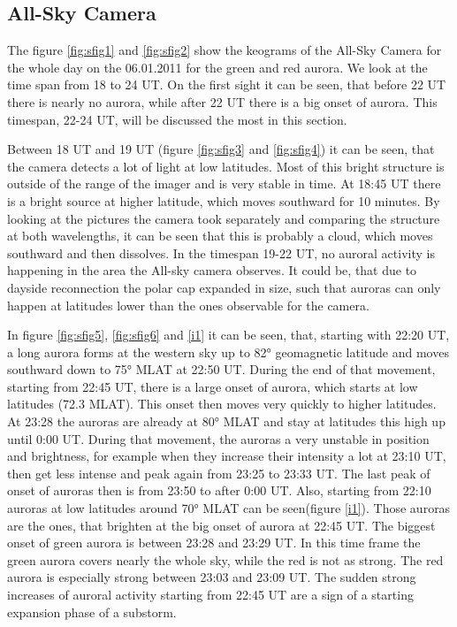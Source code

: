 \documentclass[10pt,a4paper]{article}
\begin{document}
\subsection{All-Sky Camera}

The figure \ref{fig:sfig1} and \ref{fig:sfig2} show the keograms of the All-Sky Camera for the whole day on the 06.01.2011 for the green and red aurora. We look at the time span from 18 to 24 UT. On the first sight it can be seen, that before 22 UT there is nearly no aurora, while after 22 UT there is a big onset of aurora. This timespan, 22-24 UT, will be discussed the most in this section.

Between 18 UT and 19 UT (figure \ref{fig:sfig3} and \ref{fig:sfig4}) it can be seen, that the camera detects a lot of light at low latitudes. Most of this bright structure is outside of the range of the imager and is very stable in time. At 18:45 UT there is a bright source at higher latitude, which moves southward for 10 minutes. By looking at the pictures the camera took separately and comparing the structure at both wavelengths, it can be seen that this is probably a cloud, which moves southward and then dissolves. 
In the timespan 19-22 UT, no auroral activity is happening in the area the All-sky camera observes. It could be, that due to dayside reconnection the polar cap expanded in size, such that auroras can only happen at latitudes lower than the ones observable for the camera.

 In figure \ref{fig:sfig5}, \ref{fig:sfig6} and \ref{i1} it can be seen, that, starting with 22:20 UT, a long aurora forms at the western sky up to 82° geomagnetic latitude and moves southward down to 75° MLAT at 22:50 UT. During the end of that movement, starting from 22:45 UT, there is a large onset of aurora, which starts at low latitudes (72.3 MLAT). This onset then moves very quickly to higher latitudes. At 23:28 the auroras are already at 80° MLAT and stay at latitudes this high up until 0:00 UT. During that movement, the auroras a very unstable in position and brightness, for example when they increase their intensity a lot at 23:10 UT, then get less intense and peak again from 23:25 to 23:33 UT. The last peak of onset of auroras then is from 23:50 to after 0:00 UT.
 Also, starting from 22:10 auroras at low latitudes around 70° MLAT can be seen(figure \ref{i1}). Those auroras are the ones, that brighten at the big onset of aurora at 22:45 UT.
The biggest onset of green aurora is between 23:28 and 23:29 UT. In this time frame the green aurora covers nearly the whole sky, while the red is not as strong. The red aurora is especially strong between 23:03 and 23:09 UT.
The sudden strong increases of auroral activity starting from 22:45 UT are a sign of a starting expansion phase of a substorm.
\end{document}
